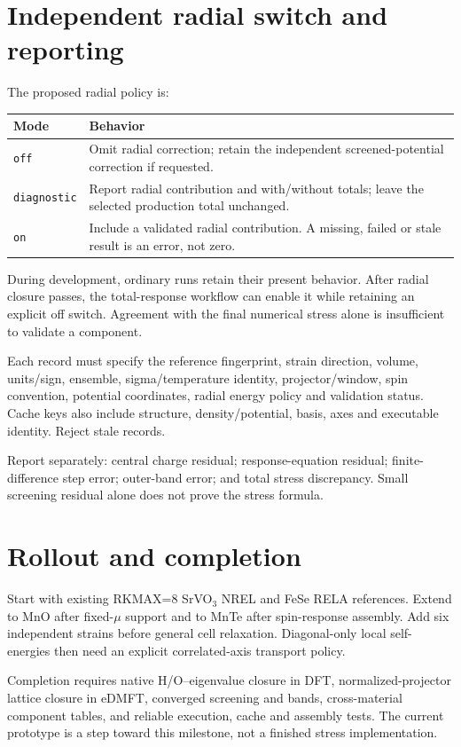 \documentclass[11pt]{article}
\begin{document}
\section{Independent radial switch and reporting}
The proposed radial policy is:
\begin{center}\small
\begin{tabular}{p{.15\linewidth}p{.74\linewidth}}\toprule
Mode & Behavior\\\midrule
\texttt{off} & Omit radial correction; retain the independent screened-potential correction if requested.\\
\texttt{diagnostic} & Report radial contribution and with/without totals; leave the selected production total unchanged.\\
\texttt{on} & Include a validated radial contribution. A missing, failed or stale result is an error, not zero.\\\bottomrule
\end{tabular}
\end{center}
During development, ordinary runs retain their present behavior. After radial closure passes, the total-response workflow can enable it while retaining an explicit off switch. Agreement with the final numerical stress alone is insufficient to validate a component.

Each record must specify the reference fingerprint, strain direction, volume, units/sign, ensemble, sigma/temperature identity, projector/window, spin convention, potential coordinates, radial energy policy and validation status. Cache keys also include structure, density/potential, basis, axes and executable identity. Reject stale records.

Report separately: central charge residual; response-equation residual; finite-difference step error; outer-band error; and total stress discrepancy. Small screening residual alone does not prove the stress formula.

\section{Rollout and completion}
Start with existing RKMAX=8 SrVO$_3$ NREL and FeSe RELA references. Extend to MnO after fixed-$\mu$ support and to MnTe after spin-response assembly. Add six independent strains before general cell relaxation. Diagonal-only local self-energies then need an explicit correlated-axis transport policy.

Completion requires native H/O--eigenvalue closure in DFT, normalized-projector lattice closure in eDMFT, converged screening and bands, cross-material component tables, and reliable execution, cache and assembly tests. The current prototype is a step toward this milestone, not a finished stress implementation.
\end{document}
